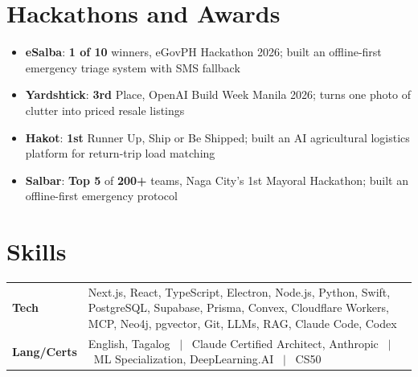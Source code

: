 \documentclass[a4paper,9pt]{article}
\begin{document}
\section{Hackathons and Awards}
\begin{itemize}
\item \textbf{eSalba}: \textbf{1 of 10} winners, eGovPH Hackathon 2026; built an offline-first emergency triage system with SMS fallback
\item \textbf{Yardshtick}: \textbf{3rd} Place, OpenAI Build Week Manila 2026; turns one photo of clutter into priced resale listings
\item \textbf{Hakot}: \textbf{1st} Runner Up, Ship or Be Shipped; built an AI agricultural logistics platform for return-trip load matching
\item \textbf{Salbar}: \textbf{Top 5} of \textbf{200+} teams, Naga City's 1st Mayoral Hackathon; built an offline-first emergency protocol
\end{itemize}

\section{Skills}
\begin{tabularx}{\linewidth}{@{}l X@{}}
\textbf{Tech} & Next.js, React, TypeScript, Electron, Node.js, Python, Swift, PostgreSQL, Supabase, Prisma, Convex, Cloudflare Workers, MCP, Neo4j, pgvector, Git, LLMs, RAG, Claude Code, Codex \\
\textbf{Lang/Certs} & English, Tagalog \ $|$ \ Claude Certified Architect, Anthropic \ $|$ \ ML Specialization, DeepLearning.AI \ $|$ \ CS50 \\
\end{tabularx}
\end{document}
